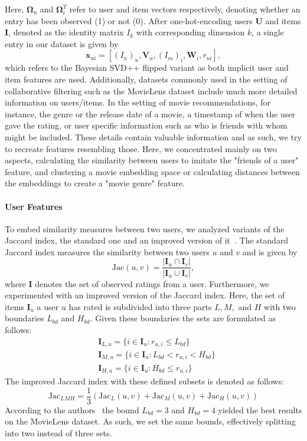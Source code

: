 \documentclass[10pt,conference,compsocconf]{IEEEtran}
\begin{document}
    Here, $\mathbf{\Omega}_u$ and $\mathbf{\Omega}^T_i$ refer to user and item vectors respectively, denoting whether an entry has been observed (1) or not (0).
    After one-hot-encoding users $\mathbf{U}$ and items $\mathbf{I}$, denoted as the identity matrix $I_k$ with corresponding dimension $k$, a single entry in our dataset is given by
    $$\mathbf{x}_{ui} = [(I_n)_u,\mathbf{V}_u,(I_m)_i,\mathbf{W}_i, r_{ui}],$$
    which refers to the Bayesian SVD++ flipped variant as both implicit user and item features are used.
    Additionally, datasets commonly used in the setting of collaborative filtering such as the MovieLens dataset include much more detailed information on users/items.
    In the setting of movie recommendations, for instance, the genre or the release date of a movie, a timestamp of when the user gave the rating, or user specific information such as who is friends with whom might be included.
    These details contain valuable information and as such, we try to recreate features resembling those.
    Here, we concentrated mainly on two aspects, calculating the similarity between users to imitate the "friends of a user" feature, and clustering a movie embedding space or calculating distances between the embeddings to create a "movie genre" feature.

    \paragraph{User Features}
    To embed similarity measures between two users, we analyzed variants of the Jaccard index, the standard one and an improved version of it~\cite{lee_improving_2017}.
    The standard Jaccard index measures the similarity between two users $u$ and $v$ and is given by
    $$\text{Jac}(u,v)=\frac{|\mathbf{I}_u \cap \mathbf{I}_v|}{|\mathbf{I}_u \cup \mathbf{I}_v|},$$
    where $\mathbf{I}$ denotes the set of observed ratings from a user.
    Furthermore, we experimented with an improved version of the Jaccard index.
    Here, the set of items $\mathbf{I}_u$ a user $u$ has rated is subdivided into three parts $L,M,$ and $H$ with two boundaries $L_{bd}$ and $H_{bd}$.
    Given these boundaries the sets are formulated as follows:
    \begin{align*}
        &\mathbf{I}_{L,u}=\{i \in \mathbf{I}_u : r_{u,i} \leq L_{bd}\}\\
        &\mathbf{I}_{M,u}=\{i \in \mathbf{I}_u : L_{bd} < r_{u,i} < H_{bd}\}\\
        &\mathbf{I}_{H,u}=\{i \in \mathbf{I}_u : H_{bd} \leq r_{u,i}\}
    \end{align*}
    The improved Jaccard index with these defined subsets is denoted as follows:
    $$\text{Jac}_{LMH}=\frac{1}{3}(\text{Jac}_L(u,v) + \text{Jac}_M(u,v) + \text{Jac}_H(u,v))$$
    According to the authors~\cite{lee_improving_2017} the bound $L_{bd} = 3$ and $H_{bd}=4$ yielded the best results on the MovieLens dataset.
    As such, we set the same bounds, effectively splitting into two instead of three sets.
\end{document}
